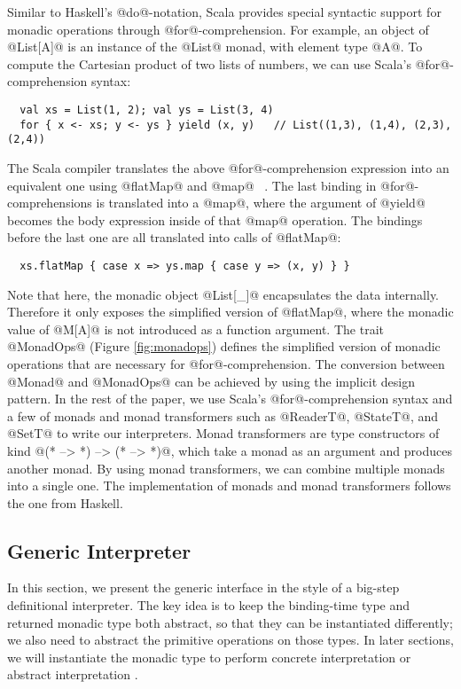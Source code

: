 Similar to Haskell's @do@-notation, Scala provides special syntactic support
for monadic operations through @for@-comprehension.  For example, an object of
@List[A]@ is an instance of the @List@ monad, with element type @A@.
To compute the Cartesian product of two lists of numbers, we can use Scala's
@for@-comprehension syntax:
\begin{lstlisting}
  val xs = List(1, 2); val ys = List(3, 4)
  for { x <- xs; y <- ys } yield (x, y)   // List((1,3), (1,4), (2,3), (2,4))
\end{lstlisting}

The Scala compiler translates the above @for@-comprehension expression into
an equivalent one using @flatMap@ and @map@ ~\cite{scala_spec}. The last binding
in @for@-comprehensions is translated into a @map@, where the argument of
@yield@ becomes the body expression inside of that @map@ operation. The 
bindings before the last one are all translated into calls of @flatMap@:
\begin{lstlisting}
  xs.flatMap { case x => ys.map { case y => (x, y) } }
\end{lstlisting}

Note that here, the monadic object @List[_]@ encapsulates the data internally.
Therefore it only exposes the simplified version of @flatMap@, where the monadic
value of @M[A]@ is not introduced as a function argument. The trait @MonadOps@ (Figure
\ref{fig:monadops}) defines the simplified version of monadic operations that
are necessary for @for@-comprehension. The conversion between @Monad@ and
@MonadOps@ can be achieved by using the implicit design pattern.
In the rest of the paper, we use Scala's @for@-comprehension syntax and a few
of monads and monad transformers such as @ReaderT@, @StateT@, and @SetT@ to
write our interpreters.
Monad transformers are type constructors of kind @(* --> *) --> (* --> *)@, which
take a monad as an argument and produces another monad. By using monad
transformers, we can combine multiple monads into a single one.  The
implementation of monads and monad transformers follows the one from Haskell.

\subsection{Generic Interpreter} \label{generic_if}

In this section, we present the generic interface in the style of a big-step
definitional interpreter. The key idea is to keep the binding-time type and
returned monadic type both abstract, so that they can be instantiated
differently; we also need to abstract the primitive operations on those types.
In later sections, we will instantiate the monadic type to perform concrete
interpretation \citet{DBLP:conf/popl/LiangHJ95} or abstract interpretation
\cite{Sergey:2013:MAI:2491956.2491979, DBLP:journals/pacmpl/DaraisLNH17}.

